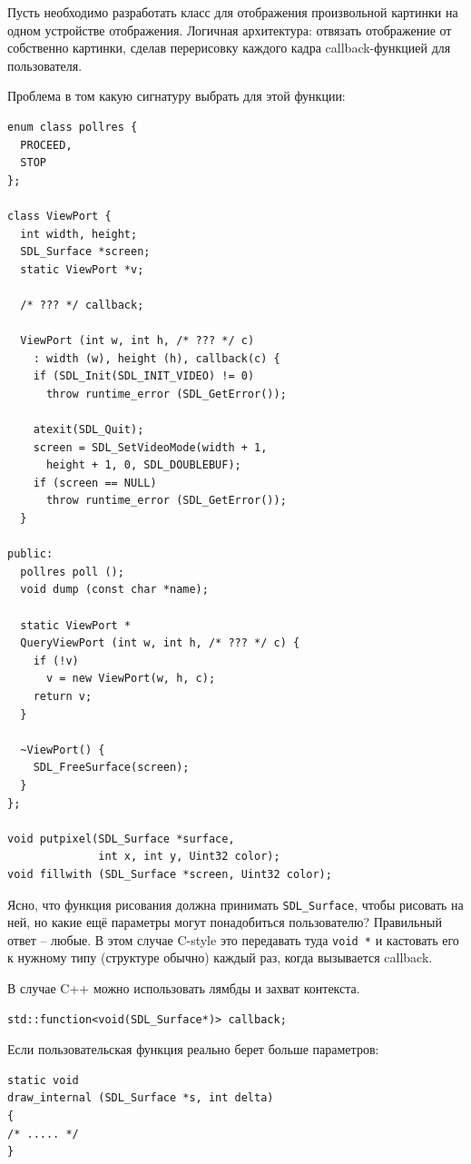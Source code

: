 \documentclass[a4paper,12pt,oneside]{article}
\begin{document}
Пусть необходимо разработать класс для отображения произвольной картинки на одном устройстве отображения. Логичная архитектура: отвязать отображение от собственно картинки, сделав перерисовку каждого кадра callback-функцией для пользователя.

Проблема в том какую сигнатуру выбрать для этой функции:

\begin{lstlisting}
enum class pollres {
  PROCEED,
  STOP
};

class ViewPort {
  int width, height;
  SDL_Surface *screen;
  static ViewPort *v;

  /* ??? */ callback;

  ViewPort (int w, int h, /* ??? */ c)
    : width (w), height (h), callback(c) {
    if (SDL_Init(SDL_INIT_VIDEO) != 0)
      throw runtime_error (SDL_GetError());

    atexit(SDL_Quit);
    screen = SDL_SetVideoMode(width + 1, 
      height + 1, 0, SDL_DOUBLEBUF);
    if (screen == NULL)
      throw runtime_error (SDL_GetError());
  }

public:
  pollres poll ();
  void dump (const char *name);

  static ViewPort *
  QueryViewPort (int w, int h, /* ??? */ c) {
    if (!v)
      v = new ViewPort(w, h, c);
    return v;
  }

  ~ViewPort() {
    SDL_FreeSurface(screen);
  }
};

void putpixel(SDL_Surface *surface, 
              int x, int y, Uint32 color);
void fillwith (SDL_Surface *screen, Uint32 color);
\end{lstlisting}

Ясно, что функция рисования должна принимать \lstinline!SDL_Surface!, чтобы рисовать на ней, но какие ещё параметры могут понадобиться пользователю? Правильный ответ -- любые. В этом случае C-style это передавать туда \lstinline!void *! и кастовать его к нужному типу (структуре обычно) каждый раз, когда вызывается callback.

В случае C++ можно использовать лямбды и захват контекста.

\begin{lstlisting}
std::function<void(SDL_Surface*)> callback;
\end{lstlisting}

Если пользовательская функция реально берет больше параметров:

\begin{lstlisting}
static void
draw_internal (SDL_Surface *s, int delta)
{
/* ..... */
}
\end{lstlisting}
\end{document}
